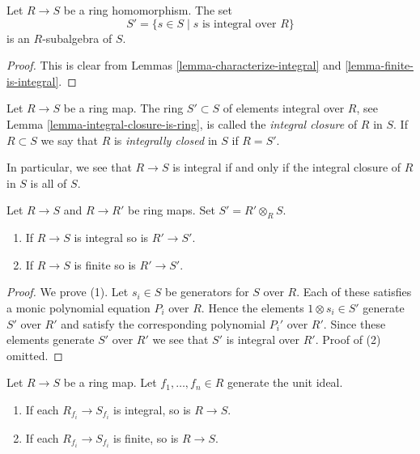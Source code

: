 \begin{lemma}
\label{lemma-integral-closure-is-ring}
Let $R \to S$ be a ring homomorphism.
The set
$$
S' = \{s \in S \mid s\text{ is integral over }R\}
$$
is an $R$-subalgebra of $S$.
\end{lemma}

\begin{proof}
This is clear from Lemmas \ref{lemma-characterize-integral}
and \ref{lemma-finite-is-integral}.
\end{proof}

\begin{definition}
\label{definition-integral-closure}
Let $R \to S$ be a ring map.
The ring $S' \subset S$ of elements integral over
$R$, see Lemma \ref{lemma-integral-closure-is-ring},
is called the {\it integral closure} of $R$
in $S$. If $R \subset S$ we say that $R$ is
{\it integrally closed} in $S$ if $R = S'$.
\end{definition}

\noindent
In particular, we see that $R \to S$ is integral if and only
if the integral closure of $R$ in $S$ is all of $S$.

\begin{lemma}
\label{lemma-base-change-integral}
Let $R \to S$ and $R \to R'$ be ring maps.
Set $S' = R' \otimes_R S$.
\begin{enumerate}
\item If $R \to S$ is integral so is $R' \to S'$.
\item If $R \to S$ is finite so is $R' \to S'$.
\end{enumerate}
\end{lemma}

\begin{proof}
We prove (1).
Let $s_i \in S$ be generators for $S$ over $R$.
Each of these satisfies a monic polynomial equation $P_i$
over $R$. Hence the elements $1 \otimes s_i \in S'$ generate
$S'$ over $R'$ and satisfy the corresponding polynomial
$P_i'$ over $R'$. Since these elements generate $S'$ over $R'$
we see that $S'$ is integral over $R'$.
Proof of (2) omitted.
\end{proof}

\begin{lemma}
\label{lemma-integral-local}
Let $R \to S$ be a ring map.
Let $f_1, \ldots, f_n \in R$ generate the unit ideal.
\begin{enumerate}
\item If each $R_{f_i} \to S_{f_i}$ is integral, so is $R \to S$.
\item If each $R_{f_i} \to S_{f_i}$ is finite, so is $R \to S$.
\end{enumerate}
\end{lemma}

